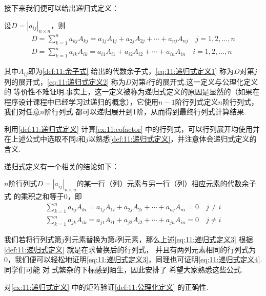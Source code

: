 接下来我们便可以给出递归式定义：
\begin{definition} \label{def:11:递归式定义}
    设$D=|a_{ij}|_{n \times n}$，则
    \begin{gather}
        \label{eq:11:递归式定义1}
        D=\sum_{k=1}^{n}a_{kj}A_{kj}=a_{1j}A_{1j}+a_{2j}A_{2j}+\cdots+a_{nj}A_{nj} \quad j=1,2,\ldots,n \\
        \label{eq:11:递归式定义2}
        D=\sum_{k=1}^{n}a_{ik}A_{ik}=a_{i1}A_{i1}+a_{i2}A_{i2}+\cdots+a_{in}A_{in} \quad i=1,2,\ldots,n
    \end{gather}
\end{definition}
其中$A_{ij}$即为\autoref{def:11:余子式} 给出的代数余子式，\autoref{eq:11:递归式定义1} 称为$D$对第$j$列的展开式，\autoref{eq:11:递归式定义2} 称为$D$对第$i$行的展开式.这一定义与公理化定义的
等价性不难证明.事实上，这一定义被称为递归式定义的原因是显然的（如果在程序设计课程中已经学习过递归的概念），它使用$n-1$阶行列式定义$n$阶行列式，我们对任意$n$阶行列式
都可以递归展开到1阶，从而得到最终行列式计算结果.
\begin{example} \label{ex:11:递归式定义}
    利用\autoref{def:11:递归式定义} 计算\autoref{ex:11:cofactor} 中的行列式，可以行列展开均使用并在上述公式中选取不同$i$和$j$以熟悉\autoref*{def:11:递归式定义}，并注意体会递归式定义的含义.
\end{example}
\begin{solution}

\end{solution}

递归式定义有一个相关的结论如下：
\begin{theorem}
    $n$阶行列式$D=|a_{ij}|_{n \times n}$的某一行（列）元素与另一行（列）相应元素的代数余子式
    的乘积之和等于0，即
    \begin{gather}
        \label{eq:11:递归式定义3}
        \sum_{k=1}^{n}a_{kj}A_{ki}=a_{1j}A_{1i}+a_{2j}A_{2i}+\cdots+a_{nj}A_{ni}=0 \quad j \neq i \\
        \label{eq:11:递归式定义4}
        \sum_{k=1}^{n}a_{jk}A_{ik}=a_{j1}A_{i1}+a_{j2}A_{i2}+\cdots+a_{jn}A_{in}=0 \quad j \neq i
    \end{gather}
\end{theorem}
我们若将行列式第$j$列元素替换为第$i$列元素，那么上述\autoref{eq:11:递归式定义3} 根据\autoref{def:11:递归式定义} 就是在求替换后的行列式，
并且有两列元素相同的行列式为0，我们便可以轻松地证明\autoref*{eq:11:递归式定义3}，同理也可证明\autoref*{eq:11:递归式定义4}. 同学们可能
对 式繁杂的下标感到陌生，因此安排了 希望大家熟悉这些公式.
\begin{example} \label{ex:11:递归式定义2}
    对\autoref{ex:11:递归式定义} 中的矩阵验证\autoref{def:11:公理化定义} 的正确性.
\end{example}
\begin{solution}

\end{solution}

